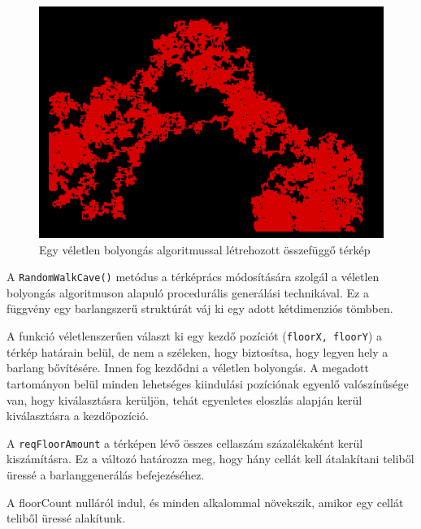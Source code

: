 \begin{figure}[ht]
\centering
\includegraphics[width =\textwidth]{images/randomwalkfigure.png}
\caption{Egy véletlen bolyongás algoritmussal létrehozott összefüggő térkép\cite{randomwalk}}
\label{fig:randomwalkfigure}
\end{figure}

\newpage
{}

A \texttt{RandomWalkCave()} metódus a térképrács módosítására szolgál a véletlen bolyongás algoritmuson alapuló procedurális generálási technikával. Ez a függvény egy barlangszerű struktúrát váj ki egy adott kétdimenziós tömbben.

A funkció véletlenszerűen választ ki egy kezdő pozíciót (\texttt{floorX, floorY}) a térkép határain belül, de nem a széleken, hogy biztosítsa, hogy legyen hely a barlang bővítésére. Innen fog kezdődni a véletlen bolyongás. A megadott tartományon belül minden lehetséges kiindulási pozíciónak egyenlő valószínűsége van, hogy kiválasztásra kerüljön, tehát egyenletes eloszlás alapján kerül kiválasztásra a kezdőpozíció.

A \texttt{reqFloorAmount} a térképen lévő összes cellaszám százalékaként kerül kiszámításra. Ez a változó határozza meg, hogy hány cellát kell átalakítani teliből üressé a barlanggenerálás befejezéséhez.

A floorCount nulláról indul, és minden alkalommal növekszik, amikor egy cellát teliből üressé alakítunk.

